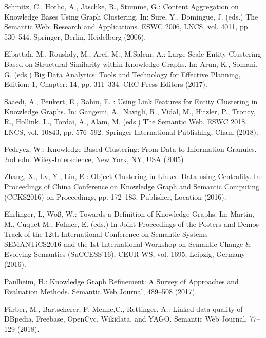 \documentclass[runningheads]{llncs}
\begin{document}
\begin{thebibliography}{8}
Schmitz, C., Hotho, A., J{\"a}schke, R., Stumme, G.: Content Aggregation on Knowledge Bases Using Graph Clustering. In: Sure, Y., Domingue, J. (eds.) The Semantic Web: Research and Applications. ESWC 2006, LNCS, vol. 4011, pp. 530--544.
Springer, Berlin, Heidelberg (2006). 

Elbattah, M., Roushdy, M., Aref, M., M.Salem, A.: Large-Scale Entity Clustering Based on Structural Similarity within Knowledge Graphs. In: Arun, K., Somani, G. (eds.) Big Data Analytics: Tools and Technology for Effective Planning, Edition: 1, Chapter: 14, pp. 311--334. CRC Press Editors (2017). 

Saaedi, A., Peukert, E., Rahm, E.  : Using Link Features for Entity Clustering in Knowledge Graphs. In: Gangemi, A., Navigli, R., Vidal, M., Hitzler, P., Troncy, R., Hollink, L., Tordai, A., Alam, M. (eds.) The Semantic Web. ESWC 2018, LNCS, vol. 10843, pp. 576--592.
Springer International Publishing, Cham (2018). 

Pedrycz, W.: Knowledge-Based Clustering: From Data to Information Granules. 2nd edn. Wiley-Interscience, New York, NY, USA (2005)

Zhang, X., Lv, Y., Lin, E : Object Clustering in Linked Data using Centrality. In: Proceedings of China Conference on Knowledge Graph and Semantic Computing (CCKS2016)
on Proceedings, pp. 172--183. Publisher, Location (2016). 

Ehrlinger, L, W{\"o}{\ss}, W.: Towards a Definition of Knowledge Graphs. In: Martin, M., Cuquet M., Folmer, E. (eds.) In Joint Proceedings of the Posters and Demos Track of the 12th International Conference on Semantic Systems - SEMANTiCS2016 and the 1st International Workshop on Semantic Change \& Evolving Semantics (SuCCESS'16), CEUR-WS, vol. 1695, Leipzig, Germany (2016). 

Paulheim, H.: Knowledge Graph Refinement: A Survey of Approaches and Evaluation Methods. Semantic Web Journal, 489--508 (2017). 

F{\"a}rber, M., Bartscherer, F, Menne,C., Rettinger, A.: Linked data quality of DBpedia, Freebase, OpenCyc, Wikidata, and YAGO. Semantic Web Journal, 77--129 (2018). 


\end{thebibliography}
\end{document}
